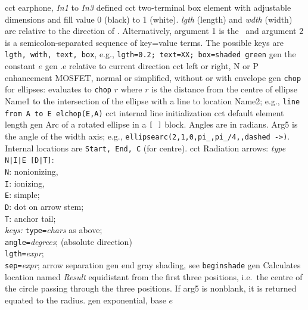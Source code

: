 %
  {cct}%
  {earphone, {\sl In1} to {\sl In3} defined
   }%
%
  {cct}%
  { two-terminal box element with adjustable dimensions and fill
   value 0 (black) to 1 (white). {\sl lgth} (length) and {\sl wdth} (width)
   are relative
   to the direction of \linespec. Alternatively, argument 1 is the
   \linespec\ and argument 2 is a semicolon-separated sequence of key=value
   terms.  The possible keys are {\tt lgth, wdth, text, box},
   e.g., {\tt lgth=0.2; text=XX;
     box=shaded green}}%
%
  {gen}%
  {the constant $e$}%
%
  {gen}%
  {.e relative to current direction}%
%
  {cct}%
  {left or right, N or P enhancement MOSFET, normal
   or simplified, without or with envelope
    }%
%
  {gen}%
  {{\tt chop} for ellipses: evaluates to {\tt chop} $r$ where $r$ is
    the distance from the centre of ellipse Name1 to the intersection of
    the ellipse with a line to location Name2;
    e.g., {\tt line from A to E elchop(E,A)}}%
%
  {cct}%
  {internal line initialization}%
%
  {cct}%
  {default element length}%
%
  {gen}%
  {Arc of a rotated ellipse in a {\tt [ ]} block. Angles are in radians.
   Arg5 is the angle of the width axis;
   e.g., {\tt ellipsearc(2,1,0,pi\_,pi\_/4,{},dashed ->)}.  Internal locations
   are {\tt Start, End, C} (for centre). }%
%
  {cct}%
  { Radiation arrows: {\sl type} {\tt N|I|E [D|T]}:\\
  {\tt N}: nonionizing,\\
  {\tt I}: ionizing,\\
  {\tt E}: simple;\\
  {\tt D}: dot on arrow stem;\\
  {\tt T}: anchor tail;\\
  {\sl keys:} {\tt type=}{\sl chars} as above;\\
  {\tt angle=}{\sl degrees}; (absolute direction)\\
  {\tt lgth=}{\sl expr};\\
  {\tt sep=}{\sl expr}; arrow separation
  }%
%
  {gen}%
  {end gray shading, see {\tt beginshade}}%
%
  {gen}%
  {Calculates location named {\sl Result} equidistant from the first three
   positions, i.e.\ the centre of the circle passing through the three
   positions.  If arg5 is nonblank, it is returned equated to the radius.}%
%
  {gen}%
  {exponential, base $e$}%

